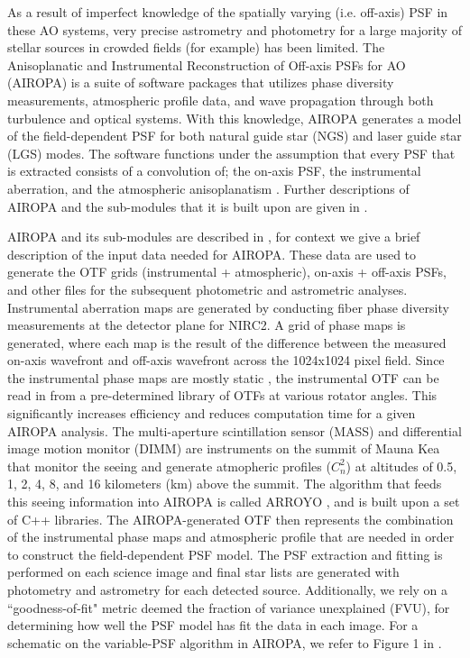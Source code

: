 \documentclass[]{spie}  %
\begin{document}
\indent As a result of imperfect knowledge of the spatially varying (i.e. off-axis) PSF in these AO systems, very precise astrometry and photometry for a large majority of stellar sources in crowded fields (for example) has been limited. The Anisoplanatic and Instrumental Reconstruction of Off-axis PSFs for AO (AIROPA) is a suite of software packages that utilizes phase diversity measurements, atmospheric profile data, and wave propagation through both turbulence and optical systems. With this knowledge, AIROPA generates a model of the field-dependent PSF for both natural guide star (NGS) and laser guide star (LGS) modes. The software functions under the assumption that every PSF that is extracted consists of a convolution of; the on-axis PSF, the instrumental aberration, and the atmospheric anisoplanatism \cite{do:2018a}. Further descriptions of AIROPA and the sub-modules that it is built upon are given in \cite{witzel:2016a}.

\indent AIROPA and its sub-modules are described in \cite{witzel:2016a}, for context we give a brief description of the input data needed for AIROPA. These data are used to generate the OTF grids (instrumental + atmospheric), on-axis + off-axis PSFs, and other files for the subsequent photometric and astrometric analyses. Instrumental aberration maps are generated by conducting fiber phase diversity measurements at the detector plane for NIRC2. A grid of phase maps is generated, where each map is the result of the difference between the measured on-axis wavefront and off-axis wavefront across the 1024x1024 pixel field. Since the instrumental phase maps are mostly static \cite{Ciurlo:inprep}, the instrumental OTF can be read in from a pre-determined library of OTFs at various rotator angles. This significantly increases efficiency and reduces computation time for a given AIROPA analysis. The multi-aperture scintillation sensor (MASS) and differential image motion monitor (DIMM) are instruments on the summit of Mauna Kea that monitor the seeing and generate atmopheric profiles ($C_n^{2}$) at altitudes of 0.5, 1, 2, 4, 8, and 16 kilometers (km) above the summit. The algorithm that feeds this seeing information into AIROPA is called ARROYO \cite{britton:2006a}, and is built upon a set of C++ libraries. The AIROPA-generated OTF then represents the combination of the instrumental phase maps and atmospheric profile that are needed in order to construct the field-dependent PSF model. The PSF extraction and fitting is performed on each science image and final star lists are generated with photometry and astrometry for each detected source. Additionally, we rely on a ``goodness-of-fit" metric deemed the fraction of variance unexplained (FVU), for determining how well the PSF model has fit the data in each image. For a schematic on the variable-PSF algorithm in AIROPA, we refer to Figure 1 in \cite{Turri:inprep}.
\end{document}
